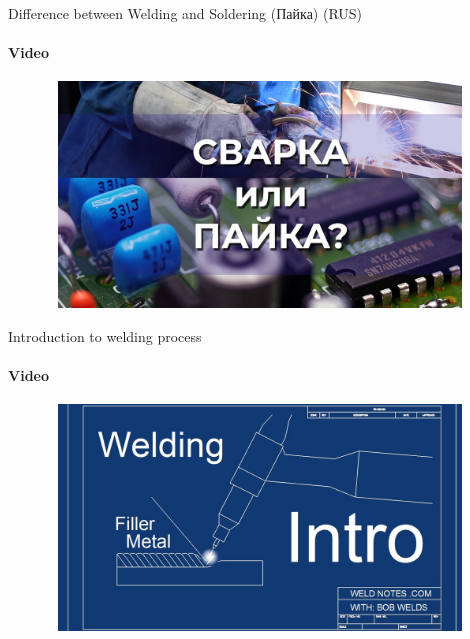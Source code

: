 \documentclass[aspectratio=169]{beamer}
\begin{document}
\begin{frame}[t]{Difference between Welding and Soldering (Пайка) (RUS)}
    \framesubtitle{Video}
    \vspace{-0.6cm}
    \begin{figure}[H]
        \href{https://youtu.be/msRRSCB1G10}{
            \centering\includegraphics[height=6cm,width=1\textwidth,keepaspectratio]{diff_welding_soldering_video.jpg}}
        \label{fig:diff_welding_soldering_video.jpg}
    \end{figure}
\end{frame}

\begin{frame}[t]{Introduction to welding process}
    \framesubtitle{Video}
    \vspace{-0.6cm}
    \begin{figure}[H]
        \href{https://youtu.be/jQddm3YONNc}{
            \centering\includegraphics[height=6cm,width=1\textwidth,keepaspectratio]{into_to_welding_video.jpg}}
        \label{fig:into_to_welding_video.jpg}
    \end{figure}
\end{frame}
\end{document}
